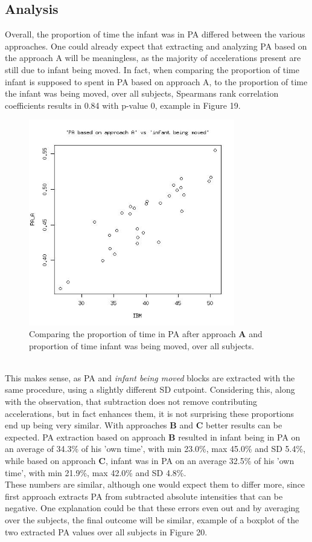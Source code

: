 \documentclass{article}
\begin{document}
{\subsection{Analysis}
Overall, the proportion of time the infant was in PA differed between the various approaches. One could already expect that extracting and analyzing PA based on the approach A will be meaningless, as the majority of accelerations present are still due to infant being moved. In fact, when comparing the proportion of time infant is supposed to spent in PA based on approach A, to the proportion of time the infant was being moved, over all subjects, Spearmans rank correlation coefficients results in 0.84 with p-value 0, example in Figure 19.
\begin{figure}[h]
\includegraphics[width=9cm, height=9cm]{PAAIBM.jpg}
\caption{Comparing the proportion of time in PA after approach \textbf{A} and proportion of time infant was being moved, over all subjects.}
\end{figure}
\\
This makes sense, as PA and \textit{infant being moved} blocks are extracted with the same procedure, using a slightly different SD cutpoint. Considering this, along with the observation, that subtraction does not remove contributing accelerations, but in fact enhances them, it is not surprising these proportions end up being very similar. With approaches \textbf{B} and \textbf{C} better results can be expected. PA extraction based on approach \textbf{B} resulted in infant being in PA on an average of 34.3\% of his 'own time', with min 23.0\%, max 45.0\% and SD 5.4\%, while based on approach \textbf{C}, infant was in PA on an average 32.5\% of his 'own time', with min 21.9\%, max 42.0\% and SD 4.8\%. \\These numbers are similar, although one would expect them to differ more, since first approach extracts PA from subtracted absolute intensities that can be negative. One explanation could be that these errors even out and by averaging over the subjects, the final outcome will be similar, example of a boxplot of the two extracted PA values over all subjects in Figure 20.
}
\end{document}
